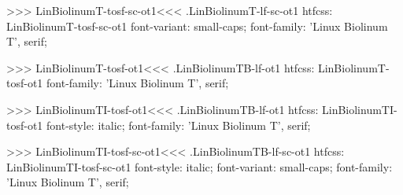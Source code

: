 {{{>>>
\<LinBiolinumT-tosf-sc-ot1\><<<
.LinBiolinumT-lf-sc-ot1
htfcss:  LinBiolinumT-tosf-sc-ot1  font-variant: small-caps; font-family: 'Linux Biolinum T', serif;

>>>
\<LinBiolinumT-tosf-ot1\><<<
.LinBiolinumTB-lf-ot1
htfcss:  LinBiolinumT-tosf-ot1  font-family: 'Linux Biolinum T', serif;

>>>
\<LinBiolinumTI-tosf-ot1\><<<
.LinBiolinumTB-lf-ot1
htfcss:  LinBiolinumTI-tosf-ot1  font-style: italic; font-family: 'Linux Biolinum T', serif;

>>>
\<LinBiolinumTI-tosf-sc-ot1\><<<
.LinBiolinumTB-lf-sc-ot1
htfcss:  LinBiolinumTI-tosf-sc-ot1  font-style: italic; font-variant: small-caps; font-family: 'Linux Biolinum T', serif;

}}}
